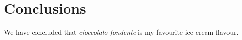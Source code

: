 \chapter{Conclusions}\label{chap:conclusions}

We have concluded that \textit{cioccolato fondente} is my favourite ice cream flavour.